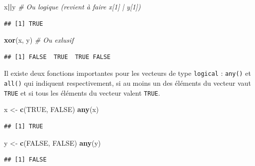 \documentclass[
  11pt,
]{book}
\newenvironment{Shaded}{\begin{snugshade}}{\end{snugshade}}
\newcommand{\CommentTok}[1]{\textcolor[rgb]{0.56,0.35,0.01}{\textit{#1}}}
\newcommand{\KeywordTok}[1]{\textcolor[rgb]{0.13,0.29,0.53}{\textbf{#1}}}
\newcommand{\NormalTok}[1]{#1}
\newcommand{\OperatorTok}[1]{\textcolor[rgb]{0.81,0.36,0.00}{\textbf{#1}}}
\newcommand{\OtherTok}[1]{\textcolor[rgb]{0.56,0.35,0.01}{#1}}
\newcommand{\StringTok}[1]{\textcolor[rgb]{0.31,0.60,0.02}{#1}}
\numberwithin{equation}{section}
\numberwithin{countremarque}{section}
\begin{document}
\begin{Shaded}
\begin{Highlighting}[]
\NormalTok{x}\OperatorTok{||}\NormalTok{y    }\CommentTok{\# \textquotesingle{}Ou\textquotesingle{} logique (revient à faire x[1] | y[1])}
\end{Highlighting}
\end{Shaded}

\begin{lstlisting}
## [1] TRUE
\end{lstlisting}

\begin{Shaded}
\begin{Highlighting}[]
\KeywordTok{xor}\NormalTok{(x, y)   }\CommentTok{\# \textquotesingle{}Ou\textquotesingle{} exlusif}
\end{Highlighting}
\end{Shaded}

\begin{lstlisting}
## [1] FALSE  TRUE  TRUE FALSE
\end{lstlisting}

Il existe deux fonctions importantes pour les vecteurs de type \texttt{logical} : \texttt{any()} et \texttt{all()} qui indiquent respectivement, si au moins un des éléments du vecteur vaut \texttt{TRUE} et si tous les éléments du vecteur valent \texttt{TRUE}.

\begin{Shaded}
\begin{Highlighting}[]
\NormalTok{x \textless{}{-}}\StringTok{ }\KeywordTok{c}\NormalTok{(}\OtherTok{TRUE}\NormalTok{, }\OtherTok{FALSE}\NormalTok{)}
\KeywordTok{any}\NormalTok{(x)}
\end{Highlighting}
\end{Shaded}

\begin{lstlisting}
## [1] TRUE
\end{lstlisting}

\begin{Shaded}
\begin{Highlighting}[]
\NormalTok{y \textless{}{-}}\StringTok{ }\KeywordTok{c}\NormalTok{(}\OtherTok{FALSE}\NormalTok{, }\OtherTok{FALSE}\NormalTok{)}
\KeywordTok{any}\NormalTok{(y)}
\end{Highlighting}
\end{Shaded}

\begin{lstlisting}
## [1] FALSE
\end{lstlisting}
\end{document}
